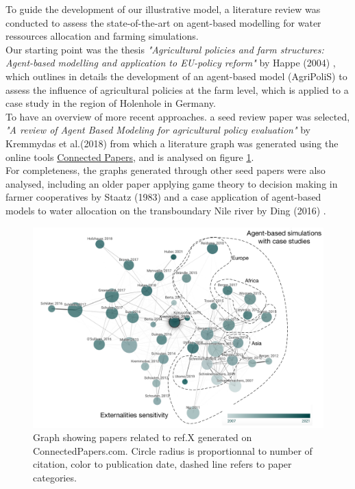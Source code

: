 \documentclass[a4paper,12pt]{article} %
\begin{document}
To guide the development of our illustrative model, a literature review was conducted to assess the state-of-the-art on agent-based modelling for water ressources allocation and farming simulations. \\
Our starting point was the thesis \textit{"Agricultural policies and farm structures: Agent-based modelling and application to EU-policy reform"} by Happe (2004) \cite{happeAgriculturalPoliciesFarm2004}, which outlines in details the development of an agent-based model (AgriPoliS) to assess the influence of agricultural policies at the farm level, which is applied to a case study in the region of Holenhole in Germany.\\
To have an overview of more recent approaches. a seed review paper was selected, \textit{"A review of Agent Based Modeling for agricultural policy evaluation"} by Kremmydas et al.(2018) \cite{kremmydasReviewAgentBased2018} from which a literature graph was generated using the online tools \href{https://www.connectedpapers.com/main/35fac7b643317e5f48f5280fadec94051bf2401f/A-review-of-Agent-Based-Modeling-for-agricultural-policy-evaluation/graph}{Connected Papers}, and is analysed on figure \ref{fig:State_of_the_art}.\\
For completeness, the graphs generated through other seed papers were also analysed, including an older paper applying game theory to decision making in farmer cooperatives by Staatz (1983) \cite{staatzGametheoreticAnalysisDecision1983} and a case application of agent-based models to water allocation on the transboundary Nile river by Ding (2016) \cite{dingAgentBasedModelling2016}.


\begin{figure}[H]
	\includegraphics[width=\textwidth]{Figures/StateOfTheArt2.pdf}
	\centering
	\caption{Graph showing papers related to ref.X generated on ConnectedPapers.com. Circle radius is proportionnal to number of citation, color to publication date, dashed line refers to paper categories.}
	\label{fig:State_of_the_art}
\end{figure}

\newpage
 

\end{document}
